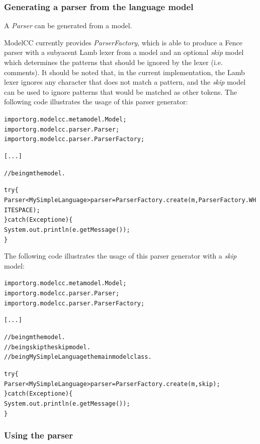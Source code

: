 \documentclass[a4paper,twoside,onecolumn]{article}
\newenvironment{colframe}{%
  \begin{Sbox} 
    \begin{minipage}{.8\columnwidth} 
}{%

  \end{minipage} 
  \end{Sbox} 
  \begin{center} 
    \fcolorbox{black}{MyGray}{\TheSbox} 
  \end{center} 
}
\begin{document}
\subsubsection{Generating a parser from the language model} \label{sec:genpar}

A \emph{Parser} can be generated from a model.

ModelCC currently provides \emph{ParserFactory}, which is able to produce a Fence parser with a subyacent Lamb lexer from a model and an optional \emph{skip} model which determines the patterns that should be ignored by the lexer (i.e. comments). It should be noted that, in the current implementation, the Lamb lexer ignores any character that does not match a pattern, and the \emph{skip} model can be used to ignore patterns that would be matched as other tokens. The following code illustrates the usage of this parser generator:

\begin{colframe}
\begin{alltt}
import org.modelcc.metamodel.Model;
import org.modelcc.parser.Parser;
import org.modelcc.parser.ParserFactory;

[...]

//being m the model.

try \{
  Parser<MySimpleLanguage> parser = ParserFactory.create(m,ParserFactory.WHITESPACE);
\} catch (Exception e) \{
  System.out.println(e.getMessage());
\}
\end{alltt}
\end{colframe}

The following code illustrates the usage of this parser generator with a \emph{skip} model:

\begin{colframe}
\begin{alltt}
import org.modelcc.metamodel.Model;
import org.modelcc.parser.Parser;
import org.modelcc.parser.ParserFactory;

[...]

//being m the model.
//being skip the skip model.
//being MySimpleLanguage the main model class.

try \{
  Parser<MySimpleLanguage> parser = ParserFactory.create(m,skip);
\} catch (Exception e) \{
  System.out.println(e.getMessage());
\}
\end{alltt}
\end{colframe}

\subsubsection{Using the parser} \label{sec:usepar}
\end{document}
